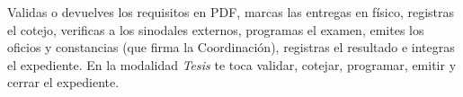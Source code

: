 \documentclass[11pt,a4paper]{article}
\begin{document}
{\small\tableofcontents}
\newpage
\begin{quevasahacer}
Validas o devuelves los requisitos en PDF, marcas las entregas en físico, registras el cotejo, verificas a los sinodales externos, programas el examen, emites los oficios y constancias (que firma la Coordinación), registras el resultado e integras el expediente. En la modalidad \emph{Tesis} te toca validar, cotejar, programar, emitir y cerrar el expediente.
\end{quevasahacer}




\end{document}

